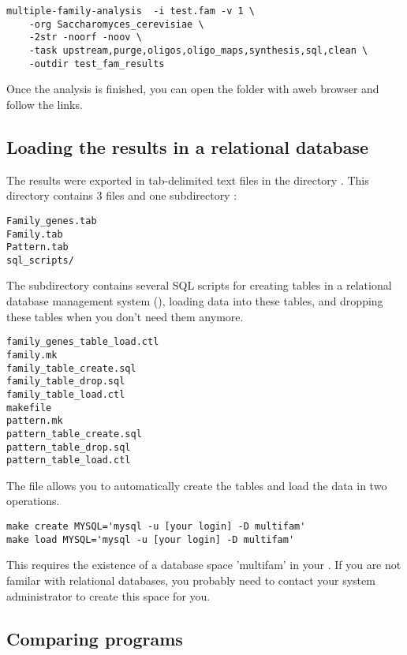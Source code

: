 \begin{verbatim}
multiple-family-analysis  -i test.fam -v 1 \
    -org Saccharomyces_cerevisiae \
    -2str -noorf -noov \
    -task upstream,purge,oligos,oligo_maps,synthesis,sql,clean \
    -outdir test_fam_results
\end{verbatim}

Once the analysis is finished, you can open the folder
\file{synthetic\_tables} with aweb browser and follow the links.

\subsection{Loading the results in a relational database}

The results were exported in tab-delimited text files in the directory
. This directory contains 3 files
and one subdirectory :

\begin{verbatim}
Family_genes.tab
Family.tab
Pattern.tab
sql_scripts/
\end{verbatim}

The subdirectory  contains several SQL scripts for creating
tables in a relational database management system (),
loading data into these tables, and dropping these tables when you
don't need them anymore.

\begin{verbatim}
family_genes_table_load.ctl
family.mk
family_table_create.sql
family_table_drop.sql
family_table_load.ctl
makefile
pattern.mk
pattern_table_create.sql
pattern_table_drop.sql
pattern_table_load.ctl
\end{verbatim}

The file  allows you to automatically create the tables
and load the data in two operations.

\begin{verbatim}
make create MYSQL='mysql -u [your login] -D multifam'
make load MYSQL='mysql -u [your login] -D multifam'
\end{verbatim}

This requires the existence of a database space 'multifam' in your
\concept{RDBMS}. If you are not familar with relational databases, you
probably need to contact your system administrator to create this
space for you.


\subsection{Comparing programs}

